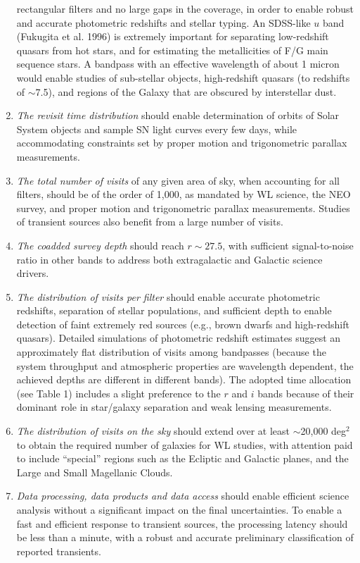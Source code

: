 \documentclass{emulateapj}
\begin{document}
\begin{enumerate}
    rectangular filters and no large gaps in the coverage, in order
    to enable robust and accurate photometric redshifts and stellar typing. An 
    SDSS-like $u$ band (Fukugita et al. 1996) is extremely important for separating 
    low-redshift quasars from hot stars, and for estimating the metallicities of 
    F/G main sequence stars. A bandpass with an effective wavelength of
    about 1 micron  would enable studies of sub-stellar objects, high-redshift 
    quasars (to redshifts of $\sim$7.5), and regions of the Galaxy that are obscured 
    by interstellar dust.
\item  {\it The revisit time distribution} should enable determination of
   orbits of Solar System objects and sample SN light curves every few days, 
   while accommodating constraints set by proper motion and trigonometric 
   parallax measurements.
\item  {\it The total number of visits} of any given area of sky, when accounting for all 
   filters, should be of the order of 1,000, as mandated by WL science, the
   NEO survey, and proper motion and 
   trigonometric parallax measurements. Studies of transient sources 
   also benefit from a large number of visits.
\item  {\it The coadded survey depth} should reach 
    $r\sim27.5$, with sufficient signal-to-noise ratio in other bands
    to address both extragalactic and Galactic science drivers.
\item  {\it The distribution of visits per filter} should enable 
   accurate photometric redshifts, separation of stellar populations,
   and sufficient depth to enable detection of faint extremely red
   sources (e.g., brown dwarfs and high-redshift quasars). Detailed simulations of 
   photometric redshift estimates
   suggest an approximately flat distribution of visits among bandpasses
   (because the system throughput and atmospheric properties are 
    wavelength dependent, the achieved depths are different in different
    bands). The adopted time allocation
   (see Table 1) includes a slight preference to the $r$ and $i$ bands because of their
   dominant role in star/galaxy separation and weak lensing measurements. 
\item  {\it The distribution of visits on the sky} should extend over
   at least $\sim$20,000 deg$^2$ to obtain the required number of galaxies
   for WL studies, with attention paid to include ``special''
   regions such as the Ecliptic and Galactic planes, and the Large and Small
   Magellanic Clouds. 
\item  {\it Data processing, data products and data access} should enable 
   efficient science analysis without a significant impact on the final 
   uncertainties. To enable a fast and efficient response to
   transient sources, the processing latency should be less than a minute,
   with a robust and accurate preliminary classification 
   of reported transients.
\end{enumerate}
\end{document}
